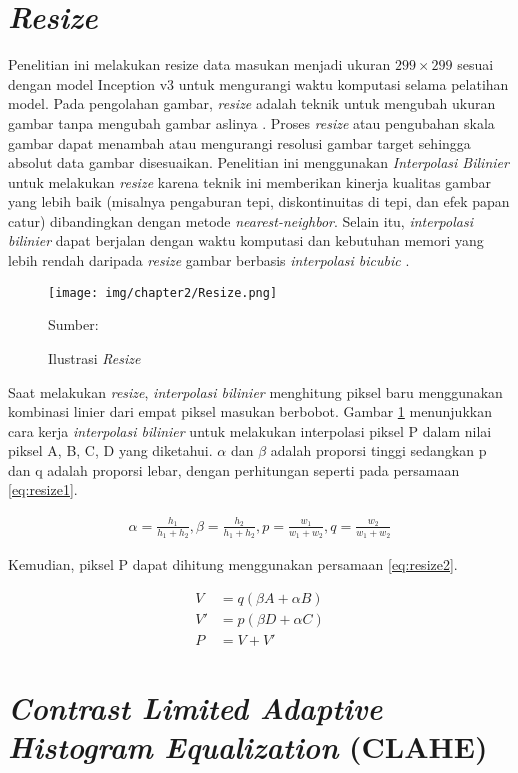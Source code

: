 \section{\textit{Resize}}
    
Penelitian ini melakukan resize data masukan menjadi ukuran $299\times 299$ sesuai dengan model Inception v3 untuk mengurangi waktu komputasi selama pelatihan model. Pada pengolahan gambar, \textit{resize} adalah teknik untuk mengubah ukuran gambar tanpa mengubah gambar aslinya \autocite{SyechAhmad2023}. Proses \textit{resize} atau pengubahan skala gambar dapat menambah atau mengurangi resolusi gambar target sehingga absolut data gambar disesuaikan. Penelitian ini menggunakan \textit{Interpolasi Bilinier} untuk melakukan \textit{resize} karena teknik ini memberikan kinerja kualitas gambar yang lebih baik (misalnya pengaburan tepi, diskontinuitas di tepi, dan efek papan catur) dibandingkan dengan metode \textit{nearest-neighbor}. Selain itu, \textit{interpolasi bilinier} dapat berjalan dengan waktu komputasi dan kebutuhan memori yang lebih rendah daripada \textit{resize} gambar berbasis \textit{interpolasi bicubic} \autocite{Ahn2018}.

\begin{figure}[H] 
    \begin{center} 
        \texttt{[image: img/chapter2/Resize.png]}
        \caption{Ilustrasi \textit{Resize}} 
        \label{fig:resize}
        Sumber: \autocite{Ahn2018}
    \end{center} 
\end{figure}

Saat melakukan \textit{resize}, \textit{interpolasi bilinier} menghitung piksel baru menggunakan kombinasi linier dari empat piksel masukan berbobot. Gambar \ref{fig:resize} menunjukkan cara kerja \textit{interpolasi bilinier} untuk melakukan interpolasi piksel P dalam nilai piksel A, B, C, D yang diketahui. $\alpha$ dan $\beta$ adalah proporsi tinggi sedangkan p dan q adalah proporsi lebar, dengan perhitungan seperti pada persamaan \ref{eq:resize1}.

\begin{align}
    \label{eq:resize1}
    \alpha = \frac{h_1}{h_1 + h_2}, \beta = \frac{h_2}{h_1 + h_2}, p = \frac{w_1}{w_1 + w_2}, q = \frac{w_2}{w_1 + w_2}
\end{align}

Kemudian, piksel P dapat dihitung menggunakan persamaan \ref{eq:resize2}.

\begin{align}
    V &= q\left( \beta A + \alpha B \right) \nonumber \\
    V' &= p\left( \beta D + \alpha C \right) \nonumber \\
    \label{eq:resize2}
    P &= V + V'
\end{align}

\section{\textit{Contrast Limited Adaptive Histogram Equalization} (CLAHE)}

